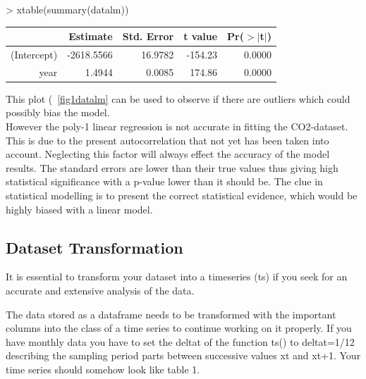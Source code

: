 \documentclass[11pt, a4paper]{article} %
\begin{document}
\begin{Schunk}
\begin{Sinput}
> xtable(summary(datalm))
\end{Sinput}
\begin{table}[ht]
\centering
\begin{tabular}{rrrrr}
  \hline
 & Estimate & Std. Error & t value & Pr($>$$|$t$|$) \\ 
  \hline
(Intercept) & -2618.5566 & 16.9782 & -154.23 & 0.0000 \\ 
  year & 1.4944 & 0.0085 & 174.86 & 0.0000 \\ 
   \hline
\end{tabular}
\end{table}\end{Schunk}


\noindent This plot (~\ref{fig1datalm} can be used to observe if there are outliers which could possibly bias the model. \\
However the poly-1 linear regression is not accurate in fitting the CO2-dataset. This is due to the present autocorrelation that not yet has been taken into account. Neglecting this factor will always effect the accuracy of the model results. The standard errors are lower than  their true values thus giving high statistical significance with a p-value lower than it should be. The clue in statistical modelling is to present the correct statistical evidence, which would be highly biased with a linear model.\\


\subsection{Dataset Transformation}
It is essential to transform your dataset into a timeseries (ts) if you seek for an accurate and extensive analysis of the data.

\noindent The data stored as a dataframe needs to be transformed with the important columns into the class of a time series to continue working on it properly. If you have monthly data you have to set the deltat of the function ts() to deltat=1/12 describing the sampling period parts between successive values xt and xt+1. Your time series should somehow look like table 1.\\
\end{document}
